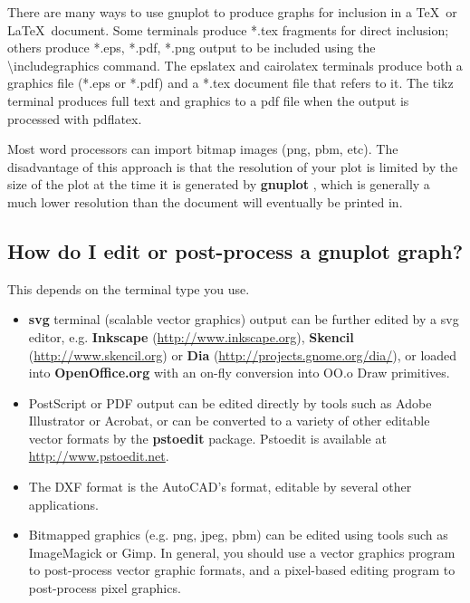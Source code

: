 \documentclass[a4paper,11pt]{article}
\def\http#1{{\small\href{http://#1}{\url{http://#1}}}}
\newcommand{\http}[1]%
            {\htmladdnormallink{\latex{\url{http://#1}}%
                    \html{\textit{http://#1}}}%
                {http://#1}%
            }
\newcommand{\gnuplot}{\textbf{gnuplot }}
\begin{document}
There are many ways to use gnuplot to produce graphs for inclusion in a
\TeX\ or \LaTeX\ document.
Some terminals produce *.tex fragments for direct inclusion; others
produce *.eps, *.pdf, *.png output to be included using the
\textbackslash{}includegraphics command.
The epslatex and cairolatex terminals produce both a graphics
file (*.eps or *.pdf) and a *.tex document file that refers to it.
The tikz terminal produces full text and graphics to a pdf file
when the output is processed with pdflatex.

Most word processors can import bitmap images (png, pbm, etc).
The disadvantage of this approach is that the resolution of your
plot is limited by the size of the plot at the time it is generated
by \gnuplot, which is generally a much lower resolution than the
document will eventually be printed in.


\subsection{How do I edit or post-process a \gnuplot graph?}

This depends on the terminal type you use.

\begin{itemize}

\item \textbf{svg} terminal (scalable vector graphics) output can
be further edited by a svg editor, e.g.
\textbf{Inkscape} (\http{www.inkscape.org}),
\textbf{Skencil} (\http{www.skencil.org}) or
\textbf{Dia} (\http{projects.gnome.org/dia/}), or loaded
into \textbf{OpenOffice.org} with an on-fly conversion into OO.o Draw
primitives.

\item PostScript or PDF output can be edited directly by tools such
as Adobe Illustrator or Acrobat, or can be converted to a variety
of other editable vector formats by the \textbf{pstoedit} package.
Pstoedit is available at \http{www.pstoedit.net}.

\item The DXF format is the AutoCAD's format, editable by several
other applications.

\item Bitmapped graphics (e.g. png, jpeg, pbm) can be edited using
tools such as ImageMagick or Gimp.
In general, you should use a vector graphics program to post-process
vector graphic formats, and a pixel-based editing program
to post-process pixel graphics.

\end{itemize}
\end{document}

